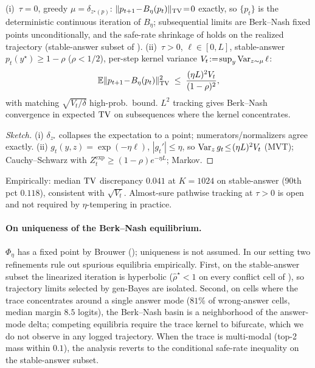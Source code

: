 \begin{theorem}
\label{thm:tracking-tau0}\label{cor:bn-convergence-tau0}\label{thm:tracking-tau-pos}
\textup{(i)~$\tau\!=\!0$, greedy $\mu\!=\!\delta_{z^\star(p)}$:}
$\|p_{t+1}\!-\!B_\eta(p_t)\|_{\operatorname{TV}}\!=\!0$ exactly, so $\{p_t\}$ is the
deterministic continuous iteration of $B_\eta$; subsequential limits
are Berk--Nash fixed points unconditionally, and the safe-rate
shrinkage of  holds on the realized trajectory
(stable-answer subset of ).
\textup{(ii)~$\tau\!>\!0$, $\ell\!\in\![0,L]$, stable-answer
$p_t(y^\star)\!\ge\!1\!-\!\rho$ ($\rho\!<\!1/2$), per-step kernel
variance $V_t\!:=\!\sup_y\operatorname{Var}_{z\sim\mu}\ell$:}
\begin{equation}
\mathbb{E}\|p_{t+1}\!-\!B_\eta(p_t)\|_{\operatorname{TV}}^{2}
\;\le\;\frac{(\eta L)^2 V_t}{(1-\rho)^2},
\label{eq:tracking-tau-pos}
\end{equation}
with matching $\sqrt{V_t/\delta}$ high-prob.\ bound.  $L^2$ tracking
gives Berk--Nash convergence in expected $\operatorname{TV}$ on subsequences
where the kernel concentrates.
\end{theorem}

\begin{proof}[Sketch]
(i) $\delta_{z^\star}$ collapses the expectation to a point;
numerators/normalizers agree exactly.
(ii) $g_t(y,z)\!=\!\exp(-\eta\ell)$, $|g_t'|\!\le\!\eta$, so
$\operatorname{Var}_z g_t\!\le\!(\eta L)^2 V_t$ (MVT); Cauchy--Schwarz with
$Z_t^{\mathrm{exp}}\!\ge\!(1\!-\!\rho)e^{-\eta L}$; Markov.
\end{proof}

Empirically: median $\operatorname{TV}$ discrepancy $0.041$ at $K\!=\!1024$ on
stable-answer (90th pct $0.118$), consistent with $\sqrt{V_t}$.
Almost-sure pathwise tracking at $\tau\!>\!0$ is open and not
required by $\eta$-tempering in practice.

\paragraph{On uniqueness of the Berk--Nash equilibrium.}
$\Phi_\eta$ has a fixed point by Brouwer ();
uniqueness is not assumed.  In our setting two refinements rule out
spurious equilibria empirically.  First, on the stable-answer subset
the linearized iteration is hyperbolic
($\widehat\rho^\star\!<\!1$ on every conflict cell of
), so trajectory limits selected
by gen-Bayes are isolated.  Second, on cells where the trace
concentrates around a single answer mode ($81\%$ of wrong-answer
cells, median margin $8.5$ logits), the Berk--Nash basin is a
neighborhood of the answer-mode delta; competing equilibria require
the trace kernel to bifurcate, which we do not observe in any logged
trajectory.  When the trace is multi-modal (top-2 mass within $0.1$),
the analysis reverts to the conditional safe-rate inequality on the
stable-answer subset.

